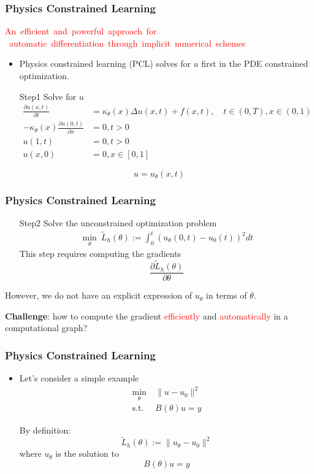 \documentclass{beamer}
\begin{document}
\begin{frame}
	\frametitle{Physics Constrained Learning}
	\begin{center}
\textcolor{red}{\mbox{An efficient and powerful approach for} \\\mbox{ automatic differentiation through implicit numerical schemes}}
	\end{center}
	\begin{itemize}
		\item Physics constrained learning (PCL) solves for $u$ first in the PDE constrained optimization. 
	\end{itemize}
	\begin{itemize}
\item[Step1] Solve for $u$
\begin{align*}
 \frac{\partial u(x, t)}{\partial t} &= {\kappa_\theta(x)}\Delta u(x, t) + f(x, t), \quad t\in (0,T), x\in (0,1) \\
-{\kappa_\theta(x)}\frac{\partial u(0,t)}{\partial x} &= 0, t>0\\
 u(1, t) &= 0, t>0\\
 u(x, 0) &= 0, x\in [0,1]
\end{align*}
	\end{itemize}
	$$\boxed{u = u_\theta(x, t)}$$
\end{frame}


\begin{frame}
	\frametitle{Physics Constrained Learning}
	
	\begin{itemize}
\item[Step2] Solve the unconstrained optimization problem
\begin{align*}
 \min_\theta \ \tilde L_h(\theta) := \int_{0}^t ( u_\theta(0, t)- u_0(t))^2 dt
\end{align*} 
This step requires computing the gradients
$$\boxed{\frac{\partial \tilde L_h(\theta)}{\partial \theta}}$$
\end{itemize}

However, we do not have an explicit expression of $u_\theta$ in terms of $\theta$.

\textbf{Challenge}: how to compute the gradient \textcolor{red}{efficiently} and \textcolor{red}{automatically} in a computational graph?

\end{frame}

\begin{frame}
	\frametitle{Physics Constrained Learning}
\begin{itemize}
	\item Let's consider a simple example
	\begin{align*}
		\min_\theta & \ \|u-u_0\|^2\\
		\mathrm{s.t.} & \ B(\theta) u = y 
	\end{align*}
	
	By definition:
	$$\tilde L_h(\theta) := \|u_\theta-u_0\|^2$$
	where $u_\theta$ is the solution to 
	$$ B(\theta) u = y $$
\end{itemize}	

\end{frame}
\end{document}

